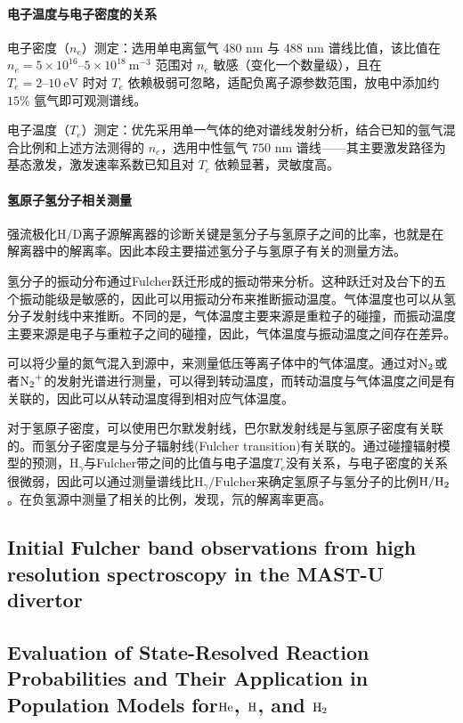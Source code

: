 \documentclass{article}
\numberwithin{equation}{subsection} %
\numberwithin{figure}{subsection} %
\numberwithin{table}{subsection} %
\begin{document}
\paragraph{电子温度与电子密度的关系}
电子密度（$n_e$）测定：选用单电离氩气 480 nm 与 488 nm 谱线比值，该比值在 $n_e=5\times10^{16}–5\times10^{18}\ \text{m}^{-3}$ 范围对 $n_e$ 敏感（变化一个数量级），且在 $T_e=2–10\ \text{eV}$ 时对 $T_e$ 依赖极弱可忽略，适配负离子源参数范围，放电中添加约 $15\%$ 氩气即可观测谱线。

电子温度（$T_e$）测定：优先采用单一气体的绝对谱线发射分析，结合已知的氩气混合比例和上述方法测得的 $n_e$，选用中性氩气 750 nm 谱线——其主要激发路径为基态激发，激发速率系数已知且对 $T_e$ 依赖显著，灵敏度高。

\paragraph{氢原子氢分子相关测量}
强流极化H/D离子源解离器的诊断关键是氢分子与氢原子之间的比率，也就是在解离器中的解离率。因此本段主要描述氢分子与氢原子有关的测量方法。

氢分子的振动分布通过Fulcher跃迁形成的振动带来分析。这种跃迁对及台下的五个振动能级是敏感的，因此可以用振动分布来推断振动温度。气体温度也可以从氢分子发射线中来推断。不同的是，气体温度主要来源是重粒子的碰撞，而振动温度主要来源是电子与重粒子之间的碰撞，因此，气体温度与振动温度之间存在差异。

可以将少量的氮气混入到源中，来测量低压等离子体中的气体温度。通过对$\ce{N2}$或者$\ce{N2+}$的发射光谱进行测量，可以得到转动温度，而转动温度与气体温度之间是有关联的，因此可以从转动温度得到相对应气体温度。

对于氢原子密度，可以使用巴尔默发射线，巴尔默发射线是与氢原子密度有关联的。而氢分子密度是与分子辐射线(Fulcher transition)有关联的。通过碰撞辐射模型的预测，$\text{H}_{\gamma}$与Fulcher带之间的比值与电子温度$T_e$没有关系，与电子密度的关系很微弱，因此可以通过测量谱线比$\text{H}_{\gamma} / \text{Fulcher}$来确定氢原子与氢分子的比例$\ce{H}/\ce{H2}$。在负氢源中测量了相关的比例，发现，氘的解离率更高。





\subsection{Initial Fulcher band observations from high resolution spectroscopy in the MAST-U divertor\cite{osborne_initial_2024}}




\subsection{Evaluation of State-Resolved Reaction Probabilities and Their Application in Population Models for$\ce{He}$, $\ce{H}$, and $\ce{H2}$\cite{wunderlich_evaluation_2016}}
\end{document}
